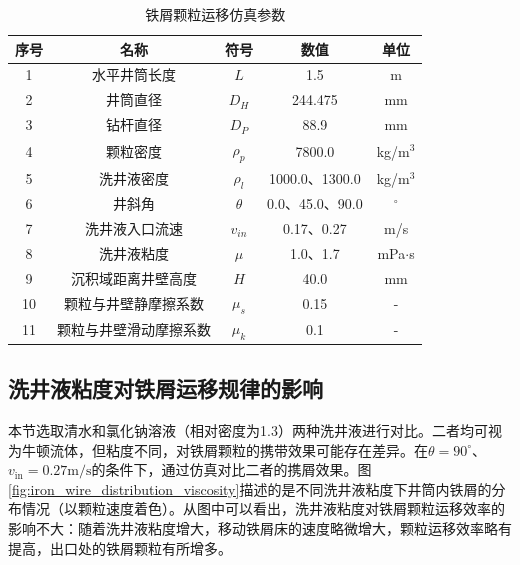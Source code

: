 \begin{table}[htbp]
    \centering
    \caption{铁屑颗粒运移仿真参数}
    \label{tab:simulation_params}
    \begin{tabularx}{.9\textwidth}{CCCCC} 
        \toprule %
        序号 & 名称 & 符号 & 数值 & 单位 \\ 
        \midrule %
        
        1 & 水平井筒长度 & $L$ & 1.5 & m \\
        2 & 井筒直径 & $D_H$ & 244.475 & mm \\
        3 & 钻杆直径 & $D_P$ & 88.9 & mm \\
        4 & 颗粒密度 & $\rho_p$ & 7800.0 & kg/m$^3$ \\
        5 & 洗井液密度 & $\rho_l$ & 1000.0、1300.0 & kg/m$^3$ \\
        6 & 井斜角 & $\theta$ & 0.0、45.0、90.0 & $^\circ$ \\
        7 & 洗井液入口流速 & $v_{in}$ & 0.17、0.27 & m/s \\
        8 & 洗井液粘度 & $\mu$ & 1.0、1.7 & mPa$\cdot$s \\
        9 & 沉积域距离井壁高度 & $H$ & 40.0 & mm \\
        10 & 颗粒与井壁静摩擦系数 & $\mu_s$ & 0.15 & - \\
        11 & 颗粒与井壁滑动摩擦系数 & $\mu_k$ & 0.1 & - \\
        
        \bottomrule %
    \end{tabularx}
\end{table}

\subsection{洗井液粘度对铁屑运移规律的影响}
本节选取清水和氯化钠溶液（相对密度为1.3）两种洗井液进行对比。二者均可视为牛顿流体，但粘度不同，对铁屑颗粒的携带效果可能存在差异。在$\theta=90^\circ$、$v_{\mathrm{in}}=0.27\mathrm{m/s}$的条件下，通过仿真对比二者的携屑效果。图\ref{fig:iron_wire_distribution_viscosity}描述的是不同洗井液粘度下井筒内铁屑的分布情况（以颗粒速度着色）。从图中可以看出，洗井液粘度对铁屑颗粒运移效率的影响不大：随着洗井液粘度增大，移动铁屑床的速度略微增大，颗粒运移效率略有提高，出口处的铁屑颗粒有所增多。

